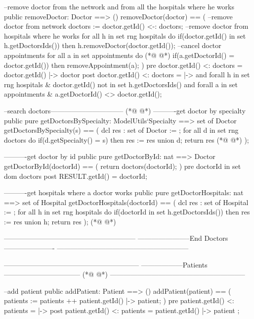 \begin{vdmpp}[breaklines=true]
  --remove doctor from the network and from all the hospitals where he works
  public removeDoctor: Doctor ==> ()
  removeDoctor(doctor) == (
   --remove doctor from network
   doctors := {doctor.getId()} <-: doctors;
   --remove doctor from hospitals where he works
   for all h in set rng hospitals do 
    if(doctor.getId() in set h.getDoctorsIds()) then
     h.removeDoctor(doctor.getId());
   --cancel doctor appointments
   for all a in set appointments do 
(*@
\label{getDoctorsBySpecialty:190}
@*)
    if(a.getDoctorId() = doctor.getId()) then
     removeAppointment(a);
  )
   pre {doctor.getId()} <: doctors = { doctor.getId() |-> doctor } 
  post {doctor.getId()} <: doctors = { |-> } and 
     forall h in set rng hospitals & doctor.getId() not in set h.getDoctorsIds() and 
     forall a in set appointments & a.getDoctorId() <> doctor.getId();
  
  
  --search doctors--------------------------------
(*@
\label{getDoctorById:200}
@*)
  ----------get doctor by specialty
  public pure getDoctorsBySpecialty: ModelUtils`Specialty ==> set of Doctor
   getDoctorsBySpecialty(s) == (
    dcl res : set of Doctor := {};
    for all d in set rng doctors do
      if(d.getSpecialty() = s) then
       res := res union {d};
    return res
(*@
\label{getDoctorHospitals:208}
@*)
   );
  
  ----------get doctor by id
  public pure getDoctorById: nat ==> Doctor
   getDoctorById(doctorId) == (
    return doctors(doctorId);
   )
  pre doctorId in set dom doctors
  post RESULT.getId() = doctorId;
   
  ----------get hospitals where a doctor works
  public pure getDoctorHospitals: nat ==> set of Hospital
   getDoctorHospitals(doctorId) == (
    dcl res : set of Hospital := {};
    for all h in set rng hospitals do
     if(doctorId in set h.getDoctorsIds()) then
      res := res union {h};
    return res
   );
(*@
\label{addPatient:227}
@*)
   
  ---------------------------------------------------------
  -----------------------End Doctors ----------------------
  ---------------------------------------------------------
  
  
  -----------------------------------------------------------
  ------------------Patients---------------------------------
(*@
\label{removePatient:235}
@*)
  -----------------------------------------------------------
  
  --add patient
  public addPatient: Patient ==> ()
  addPatient(patient) == (
   patients := patients ++  { patient.getId() |-> patient};
  )
  pre {patient.getId() } <: patients = { |-> }  
  post {patient.getId() } <: patients = { patient.getId() |-> patient };
  

\end{vdmpp}
